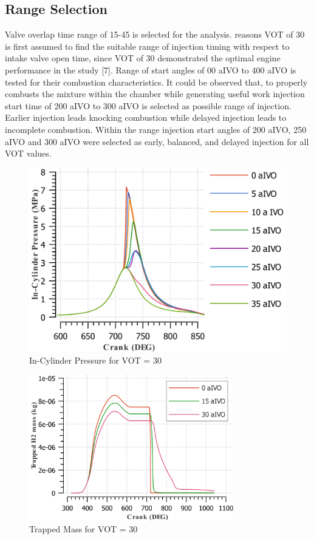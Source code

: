 \documentclass[conference]{IEEEtran}
\begin{document}
\subsection{Range Selection}
Valve overlap time range of 15-45 is selected for the analysis. reasons
VOT of 30 is first assumed to find the suitable range of injection timing with respect to intake valve open time, since VOT of 30 demonstrated the optimal engine performance in the study [7].
Range of start angles of 00 aIVO to 400 aIVO is tested for their combustion characteristics. 
It could be observed that, to properly combusts the mixture within the chamber while generating useful work injection start time of 200 aIVO to 300 aIVO is selected as possible range of injection.
Earlier injection leads knocking combustion while delayed injection leads to incomplete combustion.
Within the range injection start angles of 200 aIVO, 250 aIVO and 300 aIVO were selected as early, balanced, and delayed injection for all VOT values.

\begin{figure}[htbp]
    \centerline{\includegraphics{Plots/30_pressure.png}}
    \caption{In-Cylinder Pressure for VOT = 30}
    \label{plt_tttt}
    \end{figure}

\begin{figure}[htbp]
    \centerline{\includegraphics[width=88.9mm]{Plots/30_h2.png}}
    \caption{Trapped Mass for VOT = 30}
    \label{plt_ttt}
    \end{figure}
\end{document}
